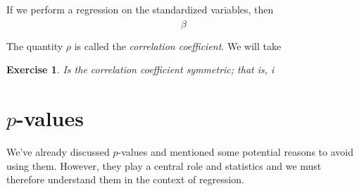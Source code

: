 \documentclass{amsart}
\newtheorem{exercise}{Exercise}
\begin{document}
If we perform a regression on the standardized variables, then 
\begin{equation}
\hat{\beta} 
\end{equation}

The quantity $\rho$ is called the \emph{correlation coefficient}. 
We will take 

\begin{exercise} Is the correlation coefficient symmetric; that is, i
\end{exercise}


\section{$p$-values}
We've already discussed $p$-values and mentioned some potential reasons to avoid using them. However, they play a central role and statistics and we must therefore understand them in the context of regression. 
\end{document}

